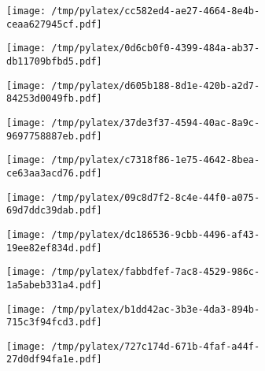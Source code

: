 \documentclass{article}
\begin{document}
\begin{figure}[htbp]
\begin{subfigure}[b]{.3\linewidth}
\texttt{[image: /tmp/pylatex/cc582ed4-ae27-4664-8e4b-ceaa627945cf.pdf]}
\end{subfigure}
\begin{subfigure}[b]{.3\linewidth}
\texttt{[image: /tmp/pylatex/0d6cb0f0-4399-484a-ab37-db11709bfbd5.pdf]}
\end{subfigure}
\begin{subfigure}[b]{.3\linewidth}
\texttt{[image: /tmp/pylatex/d605b188-8d1e-420b-a2d7-84253d0049fb.pdf]}
\end{subfigure}
\begin{subfigure}[b]{.3\linewidth}
\texttt{[image: /tmp/pylatex/37de3f37-4594-40ac-8a9c-9697758887eb.pdf]}
\end{subfigure}
\begin{subfigure}[b]{.3\linewidth}
\texttt{[image: /tmp/pylatex/c7318f86-1e75-4642-8bea-ce63aa3acd76.pdf]}
\end{subfigure}
\begin{subfigure}[b]{.3\linewidth}
\texttt{[image: /tmp/pylatex/09c8d7f2-8c4e-44f0-a075-69d7ddc39dab.pdf]}
\end{subfigure}
\begin{subfigure}[b]{.3\linewidth}
\texttt{[image: /tmp/pylatex/dc186536-9cbb-4496-af43-19ee82ef834d.pdf]}
\end{subfigure}
\begin{subfigure}[b]{.3\linewidth}
\texttt{[image: /tmp/pylatex/fabbdfef-7ac8-4529-986c-1a5abeb331a4.pdf]}
\end{subfigure}
\begin{subfigure}[b]{.3\linewidth}
\texttt{[image: /tmp/pylatex/b1dd42ac-3b3e-4da3-894b-715c3f94fcd3.pdf]}
\end{subfigure}
\begin{subfigure}[b]{.3\linewidth}
\texttt{[image: /tmp/pylatex/727c174d-671b-4faf-a44f-27d0df94fa1e.pdf]}
\end{subfigure}
\end{figure}
\end{document}

